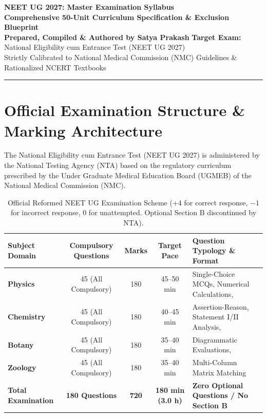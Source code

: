 \documentclass[11pt,a4paper]{article}
\begin{document}
\begin{center}
  {\huge\bfseries\color{primarydark} NEET UG 2027: Master Examination Syllabus}\\[6pt]
  {\Large\bfseries\color{accentblue} Comprehensive 50-Unit Curriculum Specification \& Exclusion Blueprint}\\[8pt]
  {\normalsize\textbf{Prepared, Compiled \& Authored by Satya Prakash} \quad\textbar\quad \textbf{Target Exam:} National Eligibility cum Entrance Test (NEET UG 2027)}\\[4pt]
  {\footnotesize\color{gray} Strictly Calibrated to National Medical Commission (NMC) Guidelines \& Rationalized NCERT Textbooks}
\end{center}
\vspace{-2pt}
\hrule height 1.2pt
\vspace{8pt}

\section*{Official Examination Structure \& Marking Architecture}

The National Eligibility cum Entrance Test (NEET UG 2027) is administered by the National Testing Agency (NTA) based on the regulatory curriculum prescribed by the Under Graduate Medical Education Board (UGMEB) of the National Medical Commission (NMC).

\begin{table}[htbp]
\centering
\small
\renewcommand{\arraystretch}{1.2}
\begin{tabularx}{\textwidth}{l c c c Y}
\toprule
\textbf{Subject Domain} & \textbf{Compulsory Questions} & \textbf{Marks} & \textbf{Target Pace} & \textbf{Question Typology \& Format} \\
\midrule
\textbf{Physics} & 45 (All Compulsory) & 180 & 45--50 min & Single-Choice MCQs, Numerical Calculations, \\
\textbf{Chemistry} & 45 (All Compulsory) & 180 & 40--45 min & Assertion-Reason, Statement I/II Analysis, \\
\textbf{Botany} & 45 (All Compulsory) & 180 & 35--40 min & Diagrammatic Evaluations, \\
\textbf{Zoology} & 45 (All Compulsory) & 180 & 35--40 min & Multi-Column Matrix Matching \\
\midrule
\textbf{Total Examination} & \textbf{180 Questions} & \textbf{720} & \textbf{180 min (3.0 h)} & \textbf{Zero Optional Questions / No Section B} \\
\bottomrule
\end{tabularx}
\caption{Official Reformed NEET UG Examination Scheme (+4 for correct response, $-1$ for incorrect response, 0 for unattempted. Optional Section B discontinued by NTA).}
\end{table}
\end{document}
